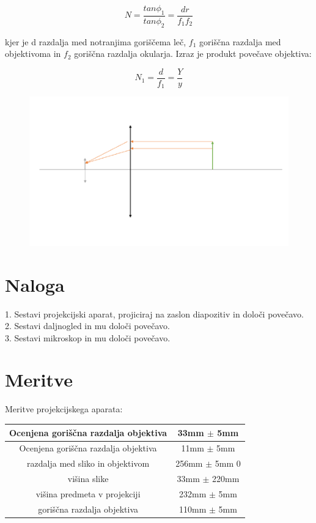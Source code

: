 \documentclass[a4paper]{report}
\begin{document}
\[N=\frac{tan\phi_1}{tan\phi_2}=\frac{dr}{f_1f_2}\]

kjer je d razdalja med notranjima goriščema leč, $f_1$ goriščna razdalja med objektivoma
in $f_2$ goriščna razdalja okularja. Izraz je produkt povečave objektiva:

\[N_1=\frac{d}{f_1}=\frac{Y}{y}\]

\begin{figure}[htp]
    \centering
    \includegraphics[width=\textwidth]{Mikroskop.png}

\end{figure}

\chapter*{Naloga}
1. Sestavi projekcijski aparat, projiciraj na zaslon diapozitiv in določi povečavo.\\
2. Sestavi daljnogled in mu določi povečavo.\\
3. Sestavi mikroskop in mu določi povečavo.



\chapter*{Meritve}


Meritve projekcijskega aparata:

\begin{center}
    \begin{tabular}{|c|c|} 
      \hline
      Ocenjena goriščna razdalja objektiva & 33mm $\pm$ 5mm \\
      \hline
      Ocenjena goriščna razdalja objektiva & 11mm $\pm$ 5mm \\
      \hline
      razdalja med sliko in objektivom & 256mm $\pm$ 5mm 0\\
      \hline
      višina slike & 33mm $\pm$ 220mm \\
      \hline
      višina predmeta v projekciji & 232mm $\pm$ 5mm \\
      \hline
      goriščna razdalja objektiva & 110mm $\pm$ 5mm \\
      \hline

    \end{tabular}
  \end{center}
  
\end{document}
